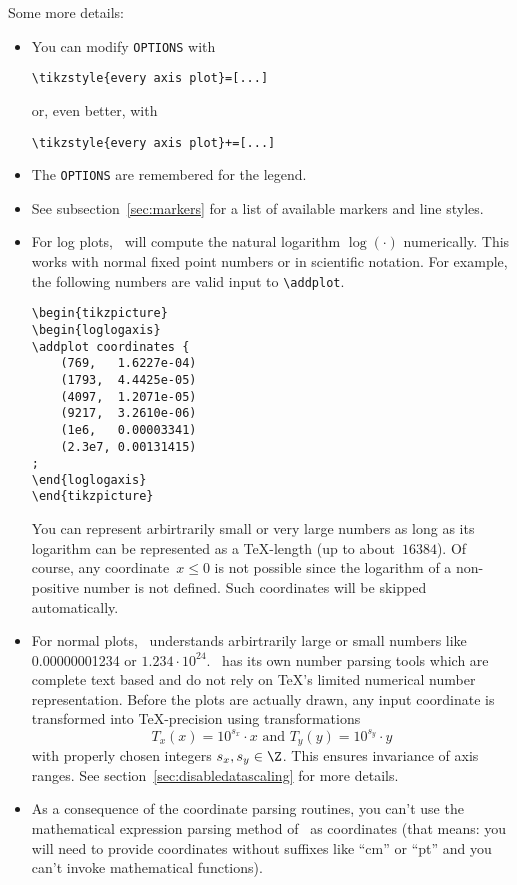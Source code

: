 \noindent
Some more details:
\begin{itemize}
	\item You can modify \texttt{OPTIONS} with
	\begin{lstlisting}[gobble=1]
	\tikzstyle{every axis plot}=[...]
	\end{lstlisting}
	or, even better, with
	\begin{lstlisting}[gobble=1]
	\tikzstyle{every axis plot}+=[...]
	\end{lstlisting}
	\item The \texttt{OPTIONS} are remembered for the legend.
	\item See subsection~\ref{sec:markers} for a list of available markers and line styles.
	\item For log plots, \PGFPlots\ will compute the natural logarithm $\log(\cdot)$ numerically. This works with normal fixed point numbers or in scientific notation. For example, the following numbers are valid input to \lstinline!\addplot!.
\begin{lstlisting}
\begin{tikzpicture}
\begin{loglogaxis}
\addplot coordinates {
	(769,	1.6227e-04)
	(1793,	4.4425e-05)
	(4097,	1.2071e-05)
	(9217,	3.2610e-06)
	(1e6,	0.00003341)
	(2.3e7,	0.00131415)
;
\end{loglogaxis}
\end{tikzpicture}
\end{lstlisting}
	You can represent arbirtrarily small or very large numbers as long as its logarithm can be represented as a \TeX-length (up to about~$16384$). Of course, any coordinate~$x\le 0$ is not possible since the logarithm of a non-positive number is not defined. Such coordinates will be skipped automatically.

	\item For normal plots, \PGFPlots\ understands arbirtrarily large or small numbers like 0.00000001234 or $1.234\cdot 10^{24}$. \PGFPlots\ has its own number parsing tools which are complete text based and do not rely on \TeX's limited numerical number representation. Before the plots are actually drawn, any input coordinate is transformed into \TeX-precision using transformations
		\[ T_x(x) = 10^{s_x} \cdot x \text{ and } T_y(y) = 10^{s_y} \cdot y \]
	with properly chosen integers $s_x, s_y \in \Z$. This ensures invariance of axis ranges. See section~\ref{sec:disabledatascaling} for more details.

	\item As a consequence of the coordinate parsing routines, you can't use the mathematical expression parsing method of \PGF\ as coordinates (that means: you will need to provide coordinates without suffixes like ``cm'' or ``pt'' and you can't invoke mathematical functions).
	

\end{itemize}
